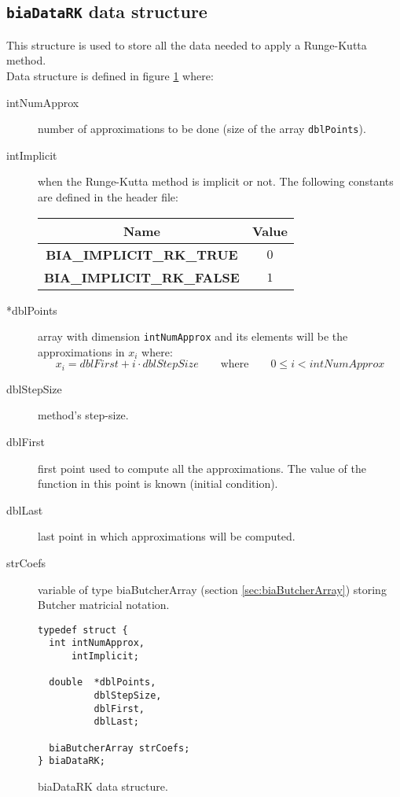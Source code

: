 
\subsection{\texttt{biaDataRK} data structure} \label{sec:biaDataRK}

This structure is used to store all the data needed to apply a Runge-Kutta method.\\

Data structure is defined in figure \ref{fig:biaDataRK} where:
%
\begin{description}
%
\item[intNumApprox] number of approximations to be done (size of the array \texttt{dblPoints}).
%
\item[intImplicit] when the Runge-Kutta method is implicit or not. The following constants are defined in the header file:
%
\begin{center}
\begin{tabular}{|c|c|}
\hline
\textbf{Name} & \textbf{Value} \\
\hline
\textbf{BIA\_IMPLICIT\_RK\_TRUE} & $0$ \\
\hline
\textbf{BIA\_IMPLICIT\_RK\_FALSE} & $1$ \\
\hline
\end{tabular}
\end{center}  
%
\item[*dblPoints] array with dimension \texttt{intNumApprox} and its elements will be the approximations in $x_i$ where:
%
\begin{displaymath}
x_i = dblFirst + i \cdot dblStepSize \qquad \textrm{where} \qquad 0 \le i < intNumApprox     
\end{displaymath}
%
\item[dblStepSize] method's step-size.
%
\item[dblFirst] first point used to compute all the approximations. The value of the function in this point is known (initial condition).
%
\item[dblLast] last point in which approximations will be computed.
%
\item[strCoefs] variable of type biaButcherArray (section \ref{sec:biaButcherArray}) storing Butcher matricial notation.
%
\end{description}

\begin{figure}[!h]
\begin{verbatim}
typedef struct {
  int intNumApprox,
      intImplicit;

  double  *dblPoints,
          dblStepSize,
          dblFirst,
          dblLast;

  biaButcherArray strCoefs;
} biaDataRK;
\end{verbatim}
\caption{biaDataRK data structure.} \label{fig:biaDataRK}
\end{figure}
%
\FloatBarrier

